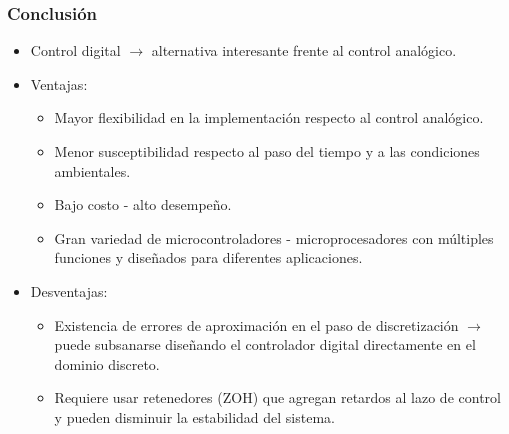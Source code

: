 \documentclass[aspectratio=169]{beamer}
\theoremstyle{definition}
\theoremstyle{plain}
\theoremstyle{remark}
\begin{document}
\begin{frame}[<+->]\frametitle{Conclusión}
	\begin{itemize}
		\item Control digital $\rightarrow$ alternativa interesante frente al control analógico.
		\item Ventajas:
		\begin{itemize}
			\item Mayor flexibilidad en la implementación respecto al control analógico.
			\item Menor susceptibilidad respecto al paso del tiempo y a las condiciones ambientales.
			\item Bajo costo - alto desempeño.
			\item Gran variedad de microcontroladores - microprocesadores con múltiples funciones y diseñados para diferentes aplicaciones.
		\end{itemize}
		\item Desventajas:
		\begin{itemize}
			\item Existencia de errores de aproximación en el paso de discretización $\rightarrow$ puede subsanarse diseñando el controlador digital directamente en el dominio discreto.
			\item Requiere usar retenedores (ZOH) que agregan retardos al lazo de control y pueden disminuir la estabilidad del sistema.
		\end{itemize}
	\end{itemize}
\end{frame}
 
\end{document}
